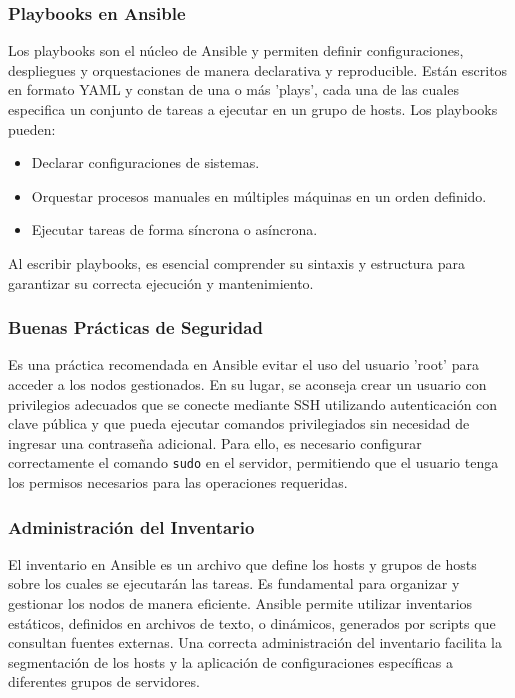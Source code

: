 \subsubsection{Playbooks en Ansible}

Los playbooks son el núcleo de Ansible y permiten definir configuraciones, despliegues y orquestaciones de manera declarativa y reproducible. Están escritos en formato YAML y constan de una o más 'plays', cada una de las cuales especifica un conjunto de tareas a ejecutar en un grupo de hosts. Los playbooks pueden:

\begin{itemize}
    \item Declarar configuraciones de sistemas.
    \item Orquestar procesos manuales en múltiples máquinas en un orden definido.
    \item Ejecutar tareas de forma síncrona o asíncrona.
\end{itemize}

Al escribir playbooks, es esencial comprender su sintaxis y estructura para garantizar su correcta ejecución y mantenimiento. \cite{turn0search2}

\subsubsection{Buenas Prácticas de Seguridad}

Es una práctica recomendada en Ansible evitar el uso del usuario 'root' para acceder a los nodos gestionados. En su lugar, se aconseja crear un usuario con privilegios adecuados que se conecte mediante SSH utilizando autenticación con clave pública y que pueda ejecutar comandos privilegiados sin necesidad de ingresar una contraseña adicional. Para ello, es necesario configurar correctamente el comando \texttt{sudo} en el servidor, permitiendo que el usuario tenga los permisos necesarios para las operaciones requeridas.

\subsubsection{Administración del Inventario}

El inventario en Ansible es un archivo que define los hosts y grupos de hosts sobre los cuales se ejecutarán las tareas. Es fundamental para organizar y gestionar los nodos de manera eficiente. Ansible permite utilizar inventarios estáticos, definidos en archivos de texto, o dinámicos, generados por scripts que consultan fuentes externas. Una correcta administración del inventario facilita la segmentación de los hosts y la aplicación de configuraciones específicas a diferentes grupos de servidores.

